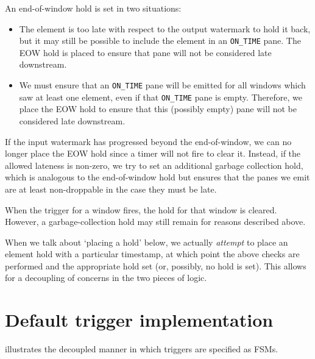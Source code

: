 \newpage
An end-of-window hold is set in two situations:
\begin{itemize}
	\item The element is too late with respect to the output watermark to hold it back, but it may still be possible to include the element in an \verb|ON_TIME| pane.
	The EOW hold is placed to ensure that pane will not be considered late downstream.
	\item We must ensure that an \verb|ON_TIME| pane will be emitted for all windows which saw at least one element, even if that \verb|ON_TIME| pane is empty.
	Therefore, we place the EOW hold to ensure that this (possibly empty) pane will not be considered late downstream.
\end{itemize}

If the input watermark has progressed beyond the end-of-window, we can no longer place the EOW hold since a timer will not fire to clear it.
Instead, if the allowed lateness is non-zero, we try to set an additional garbage collection hold, which is analogous to the end-of-window hold but ensures that the panes we emit are at least non-droppable in the case they must be late.

When the trigger for a window fires, the hold for that window is cleared.
However, a garbage-collection hold may still remain for reasons described above.

When we talk about `placing a hold' below, we actually \emph{attempt} to place an element hold with a particular timestamp, at which point the above checks are performed and the appropriate hold set (or, possibly, no hold is set).
This allows for a decoupling of concerns in the two pieces of logic.

\section{Default trigger implementation}\label{apx:additional:example-default-trigger}

 illustrates the decoupled manner in which triggers are specified as FSMs.

